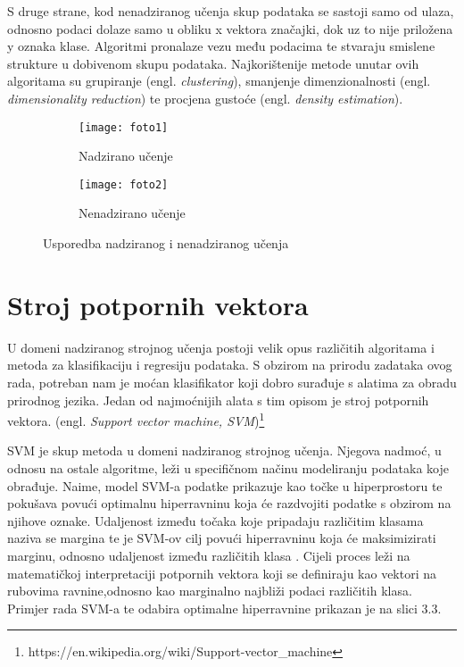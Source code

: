 \documentclass[times, utf8, zavrsni]{fer}
\begin{document}
S druge strane, kod nenadziranog učenja skup podataka se sastoji samo od ulaza, odnosno podaci dolaze samo u obliku x vektora značajki, dok uz to nije priložena y oznaka klase. Algoritmi pronalaze vezu među podacima te stvaraju smislene strukture u dobivenom skupu podataka. Najkorištenije metode unutar ovih algoritama su grupiranje (engl. \textit{clustering}), smanjenje dimenzionalnosti (engl. \textit{dimensionality reduction}) te procjena gustoće (engl. \textit{density estimation}).\newline


 
\begin{figure}
	\centering
	\begin{subfigure}{.5\textwidth}
		\centering
		\texttt{[image: foto1]}
		\caption{Nadzirano učenje}
		\label{fig:sub1}
	\end{subfigure}%
	\begin{subfigure}{.5\textwidth}
		\centering
		\texttt{[image: foto2]}
		\caption{Nenadzirano učenje}
		\label{fig:sub2}
	\end{subfigure}
	\caption{Usporedba nadziranog i nenadziranog učenja \protect\footnotemark}
	\label{fig:test}
\end{figure}

\newpage

\section{Stroj potpornih vektora}

U domeni nadziranog strojnog učenja postoji velik opus različitih algoritama i metoda za klasifikaciju i regresiju podataka. S obzirom na prirodu zadataka ovog rada, potreban nam je moćan klasifikator koji dobro surađuje s alatima za obradu prirodnog jezika. Jedan od najmoćnijih alata s tim opisom je stroj potpornih vektora. (engl. \textit{Support vector machine, SVM})\footnote{https://en.wikipedia.org/wiki/Support-vector\_machine} 

SVM je skup metoda u domeni nadziranog strojnog učenja. Njegova nadmoć, u odnosu na ostale algoritme, leži u specifičnom načinu modeliranju podataka koje obrađuje. Naime, model SVM-a podatke prikazuje kao točke u hiperprostoru  te pokušava povući optimalnu hiperravninu koja će razdvojiti podatke s obzirom na njihove oznake. Udaljenost između točaka koje pripadaju različitim klasama naziva se margina te je SVM-ov cilj povući hiperravninu koja će maksimizirati marginu, odnosno udaljenost između različitih klasa \citep{fradkin2006}. Cijeli proces leži na matematičkoj interpretaciji potpornih vektora koji se definiraju kao vektori na rubovima ravnine,odnosno kao marginalno najbliži podaci različitih klasa. Primjer rada SVM-a te odabira optimalne hiperravnine prikazan je na slici 3.3.\newline
\end{document}
